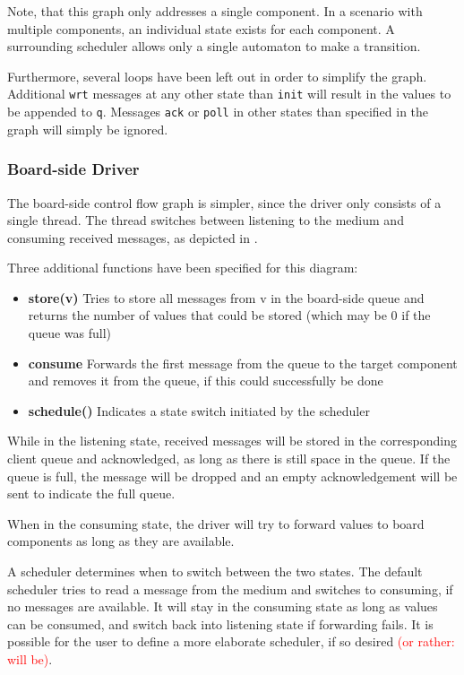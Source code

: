 \documentclass{report}
\begin{document}
Note, that this graph only addresses a single component. In a scenario with multiple components, an individual state exists for each component. A surrounding scheduler allows only a single automaton to make a transition.

Furthermore, several loops have been left out in order to simplify the graph. Additional \texttt{wrt} messages at any other state than \texttt{init} will result in the values to be appended to \texttt{q}. Messages \texttt{ack} or \texttt{poll} in other states than specified in the graph will simply be ignored.

\subsubsection{Board-side Driver}
The board-side control flow graph is simpler, since the driver only consists of a single thread. The thread switches between listening to the medium and consuming received messages, as depicted in .

Three additional functions have been specified for this diagram:
\begin{itemize} \itemsep1pt \parskip0pt 
\item \textbf{store(v)} Tries to store all messages from v in the board-side queue and returns the number of values that could be stored (which may be 0 if the queue was full)
\item \textbf{consume} Forwards the first message from the queue to the target component and removes it from the queue, if this could successfully be done
\item \textbf{schedule()} Indicates a state switch initiated by the scheduler 
\end{itemize}

While in the listening state, received messages will be stored in the corresponding client queue and acknowledged, as long as there is still space in the queue. If the queue is full, the message will be dropped and an empty acknowledgement will be sent to indicate the full queue.

When in the consuming state, the driver will try to forward values to board components as long as they are available.

A scheduler determines when to switch between the two states. The default scheduler tries to read a message from the medium and switches to consuming, if no messages are available. It will stay in the consuming state as long as values can be consumed, and switch back into listening state if forwarding fails. It is possible for the user to define a more elaborate scheduler, if so desired \textcolor{red}{(or rather: will be)}.
\end{document}
